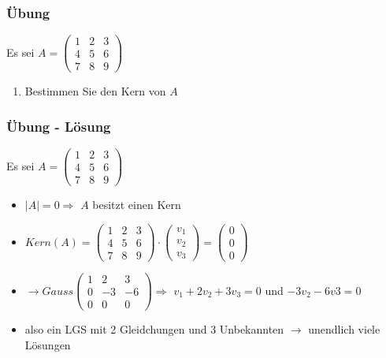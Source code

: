 \begin{frame}
    \frametitle{Übung}
    Es sei
    $A =
    \begin{pmatrix}
        1 & 2 & 3 \\
        4 & 5 & 6 \\
        7 & 8 & 9
    \end{pmatrix}$
    \begin{enumerate}
        \item Bestimmen Sie den Kern von $A$
    \end{enumerate}
\end{frame}

\begin{frame}
    \frametitle{Übung - Lösung}
    Es sei
    $A =
    \begin{pmatrix}
        1 & 2 & 3 \\
        4 & 5 & 6 \\
        7 & 8 & 9
    \end{pmatrix}$
    \begin{itemize}
        \item $|A| = 0 \Rightarrow$ $A$ besitzt einen Kern
        \item $Kern(A) =
        \begin{pmatrix}
            1 & 2 & 3 \\
            4 & 5 & 6 \\
            7 & 8 & 9
        \end{pmatrix}
        \cdot
        \begin{pmatrix}
            v_1 \\
            v_2 \\
            v_3
        \end{pmatrix}
        =
        \begin{pmatrix}
            0 \\
            0 \\
            0
        \end{pmatrix}$
        \item $\rightarrow{Gauss} \begin{pmatrix}
            1 & 2 & 3 \\
            0 & -3 & -6 \\
            0 & 0 & 0
        \end{pmatrix} 
		
		\Rightarrow$ $v_1 + 2v_2 + 3v_3 = 0$ und $-3v_2 -6v3 = 0$
		\item also ein LGS mit 2 Gleidchungen und 3 Unbekannten $\rightarrow$ unendlich viele Lösungen
    \end{itemize}
\end{frame}


